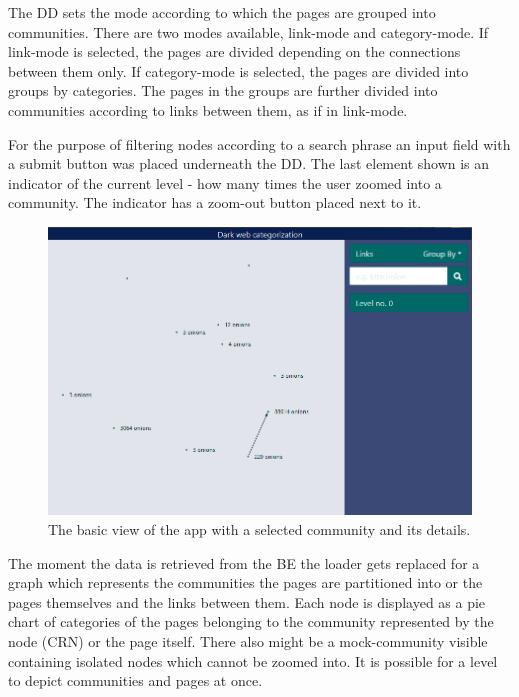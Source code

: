 The DD  sets the mode according to which the pages are grouped into communities. There are two modes available, link-mode and category-mode. If link-mode is selected, the pages are divided depending on the connections between them only. If category-mode is selected, the pages are divided into groups by categories. The pages in the groups are further divided into communities according to links between them, as if in link-mode. 

For the purpose of filtering nodes according to a search phrase an input field with a submit button was placed underneath the DD. The last element shown is an indicator of the current level - how many times the user zoomed into a community.  The indicator has a zoom-out button placed next to it.
\begin{figure}[ht!]
  \centering
  \includegraphics[width=\textwidth]{Images/ZeroLevelGraphBasic.png}
  \caption{The basic view of the app with a selected community and its details.}
  \label{zeroLevelGraphBasic}
\end{figure} 

The moment the data is retrieved from the BE the loader gets replaced for a graph which represents the communities the pages are partitioned into or the pages themselves and the links between them. Each node is displayed as a pie chart of categories of the pages belonging to the community represented by the node (CRN) or the page itself. There also might be a mock-community visible containing isolated nodes which cannot be zoomed into. It is possible for a level to depict communities and pages at once. 

